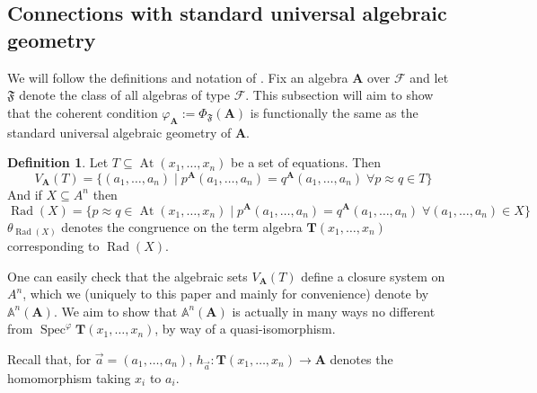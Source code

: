 \documentclass{article}
\theoremstyle{plain}
\theoremstyle{definition}
\newtheorem{definition}{Definition}[section]
\newcommand{\Spec}{\operatorname{Spec}}
\begin{document}
\subsection{Connections with standard universal algebraic geometry}

We will follow the definitions and notation of \cite{daniyarova2011algebraicgeometryalgebraicstructures}.
Fix an algebra $\mathbf{A}$ over $\mathscr{F}$ and let $\mathfrak{F}$ denote the class of all algebras of type $\mathscr{F}$.
This subsection will aim to show that the coherent condition $\varphi_\mathbf{A} := \Phi_{\mathfrak{F}}(\mathbf{A})$ is functionally the same as the standard universal algebraic geometry of $\mathbf{A}$.

\begin{definition}
    Let $T \subseteq \operatorname{At}(x_1, \dots, x_n)$ be a set of equations.
    Then 
    $$V_\mathbf{A}(T) = \{ (a_1, \dots, a_n) \mid p^\mathbf{A}(a_1, \dots, a_n) = q^\mathbf{A}(a_1, \dots, a_n) \; \forall p\approx q \in T \}$$
    And if $X \subseteq A^n$ then
    $$\operatorname{Rad}(X)= \{ p\approx q \in \operatorname{At}(x_1, \dots, x_n) \mid p^\mathbf{A}(a_1, \dots, a_n) = q^\mathbf{A}(a_1, \dots, a_n) \; \forall (a_1, \dots, a_n) \in X \}$$
    $\theta_{\operatorname{Rad}(X)}$ denotes the congruence on the term algebra $\mathbf{T}(x_1, \dots, x_n)$ corresponding to $\operatorname{Rad}(X)$.
\end{definition}

One can easily check that the algebraic sets $V_\mathbf{A}(T)$ define a closure system on $A^n$, which we (uniquely to this paper and mainly for convenience) denote by $\mathbb{A}^n(\mathbf{A})$.
We aim to show that $\mathbb{A}^n(\mathbf{A})$ is actually in many ways no different from $\Spec^\varphi \mathbf{T}(x_1,\dots, x_n)$, by way of a quasi-isomorphism.\par
Recall that, for $\vec{a} = (a_1, \dots, a_n)$, $h_{\vec{a}} \colon \mathbf{T}(x_1, \dots, x_n) \rightarrow \mathbf{A}$ denotes the homomorphism taking $x_i$ to $a_i$.
\end{document}

